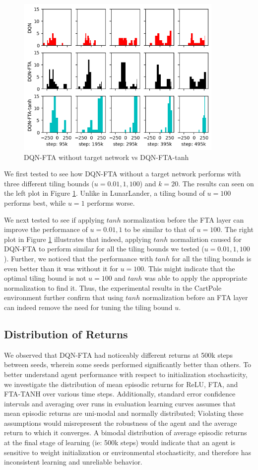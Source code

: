 \documentclass{article}
\begin{document}
\begin{figure}[h]
    \centering
    \includegraphics[width=10cm]{distribution.png}
    \caption{DQN-FTA without target network vs DQN-FTA-tanh}
    \label{fig:cartpole}
\end{figure}

We first tested to see how DQN-FTA without a target network performs with three different tiling bounds ($u=0.01, 1, 100$) and $k=20$.
The results can seen on the left plot in Figure \ref{fig:cartpole}. 
Unlike in LunarLander, a tiling bound of $u=100$ performs best, while $u=1$ performs worse.

We next tested to see if applying $tanh$ normalization before the FTA layer can improve the performance of $u=0.01, 1$ to be similar to that of $u=100$.
The right plot in Figure \ref{fig:cartpole} illustrates that indeed, applying $tanh$ normaliztion caused for DQN-FTA to perform similar for all the tiling bounds we tested ($u=0.01, 1, 100$).
Further, we noticed that the performance with $tanh$ for all the tiling bounds is even better than it was without it for $u=100$.
This might indicate that the optimal tiling bound is not $u=100$ and $tanh$ was able to apply the appropriate normalization to find it.
Thus, the experimental results in the CartPole environment further confirm that using $tanh$ normalization before an FTA layer can indeed remove the need for tuning the tiling bound $u$.


\subsection{Distribution of Returns} \label{sub-sec:distribution}
We observed that DQN-FTA had noticeably different returns at 500k steps between seeds, wherein some seeds performed significantly better than others. To better understand agent performance with respect to initialization stochasticity, we investigate the distribution of mean episodic returns for ReLU, FTA, and FTA-TANH over various time steps. Additionally, standard error confidence intervals and averaging over runs in evaluation learning curves assumes that mean episodic returns are uni-modal and normally distributed; Violating these assumptions would misrepresent the robustness of the agent and the average return to which it converges. A bimodal distribution of average episodic returns at the final stage of learning (ie: 500k steps) would indicate that an agent is sensitive to weight initialization or environmental stochasticity, and therefore has inconsistent learning and unreliable behavior. 
\end{document}

